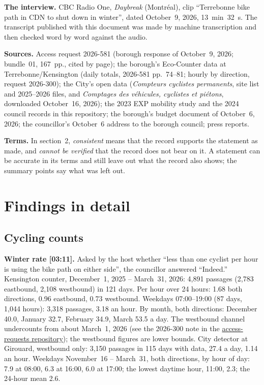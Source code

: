 \documentclass[11pt,letterpaper]{article}
\newcommand{\arurl}{https://github.com/OpenMobilityData/Terrebonne-access-requests}
\newcommand{\cliptime}[1]{\textsf{\small[#1]}}
\begin{document}
\textbf{The interview.} CBC Radio One, \emph{Daybreak} (Montréal), clip
``Terrebonne bike path in CDN to shut down in winter'', dated October~9,
2026, 13~min~32~s. The transcript published with this document was made by
machine transcription and then checked word by word against the audio.

\textbf{Sources.} Access request 2026-581 (borough response of October~9,
2026; bundle~01, 167~pp., cited by page); the borough's Eco-Counter data at
Terrebonne/Kensington (daily totals, 2026-581 pp.~74--81; hourly by
direction, request 2026-300); the City's open data (\emph{Compteurs
cyclistes permanents}, site list and 2025--2026 files, and
\emph{Comptages des véhicules, cyclistes et piétons}, downloaded October~16,
2026); the 2023 EXP mobility study and the 2024 council records in this
repository; the borough's budget document of October~6, 2026; the
councillor's October~6 address to the borough council; press reports.

\textbf{Terms.} In section~2, \emph{consistent} means that the record
supports the statement as made, and \emph{cannot be verified} that the
record does not bear on it. A statement can be accurate in its terms and
still leave out what the record also shows; the summary points say what
was left out.

\section{Findings in detail}

\subsection{Cycling counts}

\textbf{Winter rate \cliptime{03:11}.} Asked by the host whether ``less
than one cyclist per hour is using the bike path on either side'', the
councillor answered ``Indeed.'' Kensington counter, December~1, 2025 --
March~31, 2026: 4{,}891 passages (2{,}783 eastbound, 2{,}108 westbound) in
121 days. Per hour over 24 hours: 1.68 both directions, 0.96 eastbound,
0.73 westbound. Weekdays 07:00--19:00 (87 days, 1{,}044 hours): 3{,}318
passages, 3.18 an hour. By month, both directions: December 40.0, January
32.7, February 34.9, March 53.5 a day. The westbound channel undercounts
from about March~1, 2026 (see the 2026-300 note in the
\href{\arurl}{access-requests repository}); the westbound figures are lower
bounds. City detector at Girouard, westbound only: 3{,}150 passages in 115
days with data, 27.4 a day, 1.14 an hour. Weekdays November~16 --
March~31, both directions, by hour of day: 7.9 at 08:00, 6.3 at 16:00,
6.0 at 17:00; the lowest daytime hour, 11:00, 2.3; the 24-hour mean 2.6.
\end{document}
